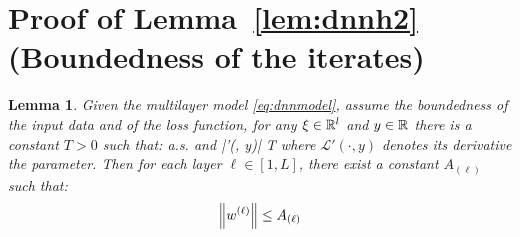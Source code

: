 \documentclass[11pt]{article}
\newtheorem*{Lemma*}{Lemma}
\theoremstyle{k}
\begin{document}
\section{Proof of Lemma~\ref{lem:dnnh2} (Boundedness of the iterates)}\label{app:lemdnnh2}
\begin{Lemma*}
Given the multilayer model \eqref{eq:dnnmodel}, assume the boundedness of the input data and of the loss function, \ie for any $\xi \in \mathbb{R}^l$ and $y \in \mathbb{R}$ there is a constant $T >0$ such that:
\beq\label{eq:mildassumptions}
\norm{\xi}  \quad \textrm{a.s.} \quad \textrm{and} |'(\cdot, y)| \leq T
\eeq
where $\mathcal{L}'(\cdot, y)$ denotes its derivative \wrt the parameter. Then for each layer $\ell \in [1,L]$, there exist a constant $A_{(\ell)}$ such that:
$$
\left\Vert w^{(\ell)} \right\Vert \leq A_{(\ell)}
$$
\end{Lemma*}
\end{document}
